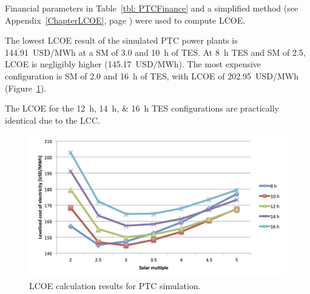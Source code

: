 Financial parameters in Table~\ref{tbl: PTCFinance} and a simplified method (see Appendix~\ref{ChapterLCOE}, page \pageref{ChapterLCOE}) were used to compute \ac{LCOE}. 


The lowest \ac{LCOE} result of the simulated \ac{PTC} power plants is \SI{144.91}{USD/MWh} at a \ac{SM} of \num{3.0} and \SI{10}{h} of \ac{TES}. At \SI{8}{h} \ac{TES} and \ac{SM} of \num{2.5}, \ac{LCOE} is negligibly higher (\SI{145.17}{USD/MWh}). The most expensive configuration is \ac{SM} of 2.0 and \SI{16}{h} of \ac{TES}, with \ac{LCOE} of \SI{202.95}{USD/MWh} (Figure~\ref{PTC_LCOE}). 

The \ac{LCOE} for the \SIlist{12;14;16}{h} \ac{TES} configurations are practically identical due to the \ac{LCC}.

\begin{figure}[htbp]
\centering
\includegraphics[width=1\linewidth]{FIG/PTC_LCOE}
\caption[LCOE calculation results for PTC simulation.]{LCOE calculation results for PTC simulation.}\label{PTC_LCOE}
\end{figure}


